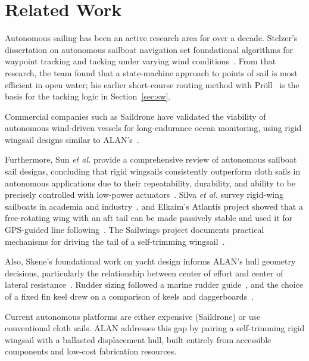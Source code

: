 \section{Related Work}
\label{sec:related}

Autonomous sailing has been an active research area for over a decade.
Stelzer's dissertation on autonomous sailboat navigation set foundational
algorithms for waypoint tracking and tacking under varying wind
conditions~\cite{stelzer2012}. From that research, the team found that a
state-machine approach to points of sail is most efficient in open water; his
earlier short-course routing method with Pr\"oll~\cite{stelzer2008} is the
basis for the tacking logic in Section~\ref{sec:sw}.

Commercial companies such as Saildrone have validated the viability of
autonomous wind-driven vessels for long-endurance ocean monitoring, using
rigid wingsail designs similar to ALAN's~\cite{saildrone,meinig2019}.

Furthermore, Sun \emph{et al.} provide a comprehensive review of autonomous
sailboat sail designs, concluding that rigid wingsails consistently
outperform cloth sails in autonomous applications due to their repeatability,
durability, and ability to be precisely controlled with low-power
actuators~\cite{sun2025}. Silva \emph{et al.} survey rigid-wing sailboats in
academia and industry~\cite{silva2019}, and Elkaim's Atlantis project showed
that a free-rotating wing with an aft tail can be made passively stable and
used it for GPS-guided line following~\cite{elkaim2006,elkaim2008}. The
Sailwings project documents practical mechanisms for driving the tail of a
self-trimming wingsail~\cite{sailwings}.

Also, Skene's foundational work on yacht design informs ALAN's hull geometry
decisions, particularly the relationship between center of effort and center
of lateral resistance~\cite{skene2001}. Rudder sizing followed a marine
rudder guide~\cite{noahrudder}, and the choice of a fixed fin keel drew on a
comparison of keels and daggerboards~\cite{sailingcats}.

Current autonomous platforms are either expensive (Saildrone) or use
conventional cloth sails. ALAN addresses this gap by pairing a self-trimming
rigid wingsail with a ballasted displacement hull, built entirely from
accessible components and low-cost fabrication resources.
